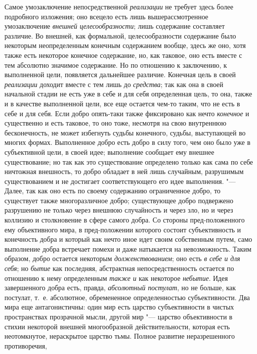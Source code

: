 {{Самое умозаключение непосредственной
{\em реализации} не
требует здесь более подробного изложения; оно всецело есть лишь
вышерассмотренное умозаключение
{\em внешней целесообразности};
лишь содержание составляет различие. Во внешней, как
формальной, целесообразности содержание было некоторым неопределенным
конечным содержанием вообще, здесь же оно, хотя также есть некоторое
конечное содержание, но, как таковое, оно есть вместе с тем абсолютно
значимое содержание. Но по отношению к заключению, к выполненной цели,
появляется дальнейшее различие. Конечная цель в своей
{\em реализации} доходит
вместе с тем лишь до {\em средства};
так как она в своей начальной стадии не есть уже в себе и для
себя определенная цель, то она, также и в качестве выполненной цели, все
еще остается чем-то таким, что не есть в себе и для себя. Если добро
опять-таки также фиксировано как нечто
{\em конечное} и
существенно и есть таковое, то оно тоже, несмотря на свою внутреннюю
бесконечность, не может избегнуть судьбы конечного, судьбы, выступающей во
многих формах. Выполненное добро есть добро в силу того, чем оно было уже в
субъективной цели, в своей идее; выполнение сообщает ему внешнее
существование; но так как это существование определено только как сама по
себе ничтожная внешность, то добро обладает в ней лишь случайным,
разрушимым существованием и не достигает соответствующего его идее
выполнения. "--- Далее, так как оно есть по своему содержанию
ограниченное добро, то существует также многоразличное добро; существующее
добро подвержено разрушению не только через внешнюю случайность и через
зло, но и через коллизию и столкновение в сфере самого добра. Со стороны
пред-положенного ему объективного мира, в пред-положении которого состоит
субъективность и конечность добра и который как нечто иное идет своим
собственным путем, само выполнение добра встречает помехи и даже натыкается
на невозможность. Таким образом, добро остается некоторым
{\em долженствованием};
оно есть {\em в себе и для
себя}; но {\em бытие}
как последняя, абстрактная непосредственность остается по
отношению к нему определенным {\em также
и} как некоторое
{\em небытие}. Идея
завершенного добра есть, правда,
{\em абсолютный постулат},
но не больше, как постулат, т.~е. абсолютное, обремененное
определенностью субъективности. Два мира еще антагонистичны: один мир есть
царство субъективности в чистых пространствах прозрачной мысли, другой мир
"--- царство объективности в стихии некоторой внешней
многообразной действительности, которая есть неотомкнутое, нераскрытое
царство тьмы. Полное развитие неразрешенного противоречия,
}}
